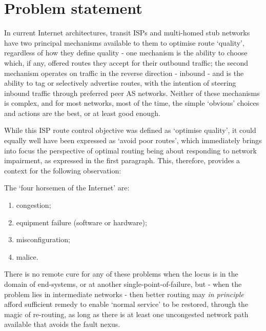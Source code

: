 
\section{Problem statement}

In current Internet architectures, transit ISPs and multi-homed stub networks have two principal mechanisms available to them to optimise route `quality', regardless of how they define quality - one mechanism is the ability to choose which, if any, offered routes they accept for their outbound traffic; the second mechanism operates on traffic in the reverse direction -  inbound - and is the ability to tag or selectively advertise routes, with the intention of steering inbound traffic through preferred peer AS networks.  Neither of these mechanisms is complex, and for most networks, most of the time, the simple `obvious' choices and actions are the best, or at least good enough.

While this ISP route control objective was defined as `optimise quality', it could equally well have been expressed as `avoid poor routes', which immediately brings into focus the perspective of optimal routing being about responding to network impairment, as expressed in the first paragraph. This, therefore, provides a context for the following observation:

\medskip

The `four horsemen of the Internet' are:

\begin{enumerate}
	\item congestion;
	\item equipment failure (software or hardware);
	\item misconfiguration;
	\item malice.
\end{enumerate}

There is no remote cure for any of these problems when the locus is in the domain of end-systems, or at another single-point-of-failure, but - when the problem lies in intermediate networks - then better routing may \textit{in principle} afford sufficient remedy to enable `normal service' to be restored, through the magic of re-routing, as long as there is at least one uncongested network path available that avoids the fault nexus.

